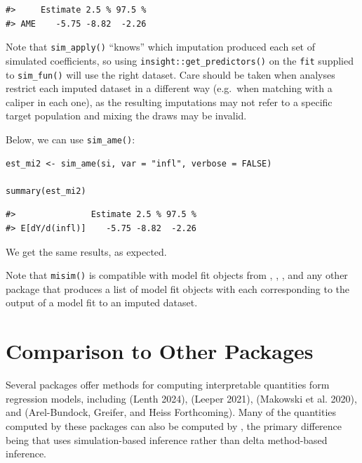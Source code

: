 \begin{verbatim}
#>     Estimate 2.5 % 97.5 %
#> AME    -5.75 -8.82  -2.26
\end{verbatim}

Note that \texttt{sim\_apply()} ``knows'' which imputation produced each set of simulated coefficients, so using \texttt{insight::get\_predictors()} on the \texttt{fit} supplied to \texttt{sim\_fun()} will use the right dataset. Care should be taken when analyses restrict each imputed dataset in a different way (e.g.~when matching with a caliper in each one), as the resulting imputations may not refer to a specific target population and mixing the draws may be invalid.

Below, we can use \texttt{sim\_ame()}:

\begin{verbatim}
est_mi2 <- sim_ame(si, var = "infl", verbose = FALSE)

summary(est_mi2)
\end{verbatim}

\begin{verbatim}
#>               Estimate 2.5 % 97.5 %
#> E[dY/d(infl)]    -5.75 -8.82  -2.26
\end{verbatim}

We get the same results, as expected.

Note that \texttt{misim()} is compatible with model fit objects from , , , and any other package that produces a list of model fit objects with each corresponding to the output of a model fit to an imputed dataset.

\section{Comparison to Other Packages}\label{comparison-to-other-packages}

Several packages offer methods for computing interpretable quantities form regression models, including  (Lenth 2024),  (Leeper 2021),  (Makowski et al. 2020), and  (Arel-Bundock, Greifer, and Heiss Forthcoming). Many of the quantities computed by these packages can also be computed by , the primary difference being that  uses simulation-based inference rather than delta method-based inference.

